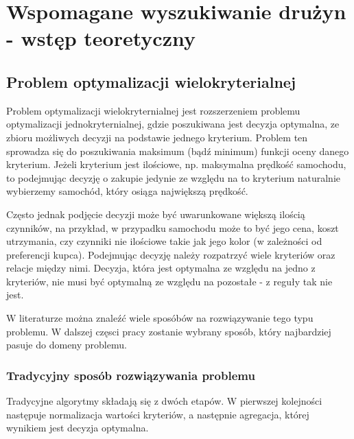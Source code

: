 \documentclass[a4paper,11pt]{article}
\begin{document}
\tableofcontents
\newpage

\section{Wspomagane wyszukiwanie drużyn - wstęp teoretyczny}

\subsection{Problem optymalizacji wielokryterialnej}

Problem optymalizacji wielokryternialnej jest rozszerzeniem problemu optymalizacji jednokryternialnej, gdzie poszukiwana jest decyzja optymalna, ze zbioru możliwych decyzji na podstawie jednego kryterium. Problem ten sprowadza się do poszukiwania maksimum (bądź minimum) funkcji  oceny danego kryterium. Jeżeli kryterium jest ilościowe, np. maksymalna prędkość samochodu, to podejmując decyzję o zakupie jedynie ze względu na to kryterium naturalnie wybierzemy samochód, który osiąga największą prędkość.

Często jednak podjęcie decyzji może być uwarunkowane większą ilością czynników, na przykład, w przypadku samochodu może to być jego cena, koszt utrzymania, czy czynniki nie ilościowe takie jak jego kolor (w zależności od preferencji kupca). Podejmując decyzję należy rozpatrzyć wiele kryteriów oraz relacje między nimi. Decyzja, która jest optymalna ze względu na jedno z kryteriów, nie musi być optymalną ze względu na pozostałe - z reguły tak nie jest. 

W literaturze można znaleźć wiele sposóbów na rozwiązywanie tego typu problemu. W dalszej częsci pracy zostanie wybrany sposób, który najbardziej pasuje do domeny problemu.


\subsubsection{Tradycyjny sposób rozwiązywania problemu}

Tradycyjne algorytmy składają się z dwóch etapów. W pierwszej kolejności następuje normalizacja wartości kryteriów, a następnie agregacja, której wynikiem jest decyzja optymalna. 
\end{document}
